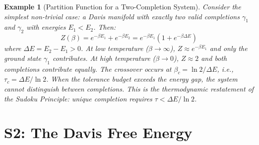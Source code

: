\documentclass[11pt,letterpaper]{article}
\newtheorem{example}[conjecture]{Example}
\begin{document}
\begin{example}[Partition Function for a Two-Completion System]
Consider the simplest non-trivial case: a Davis manifold with exactly two 
valid completions $\gamma_1$ and $\gamma_2$ with energies $E_1 < E_2$. Then:
\begin{equation}
    Z(\beta) = e^{-\beta E_1} + e^{-\beta E_2} 
    = e^{-\beta E_1}\left(1 + e^{-\beta \Delta E}\right)
\end{equation}
where $\Delta E = E_2 - E_1 > 0$. At low temperature ($\beta \to \infty$), 
$Z \approx e^{-\beta E_1}$ and only the ground state $\gamma_1$ contributes. 
At high temperature ($\beta \to 0$), $Z \approx 2$ and both completions 
contribute equally. The crossover occurs at $\beta_c = \ln 2 / \Delta E$, 
i.e., $\tau_c = \Delta E / \ln 2$. When the tolerance budget exceeds the 
energy gap, the system cannot distinguish between completions. This is the 
thermodynamic restatement of the Sudoku Principle: unique completion requires 
$\tau < \Delta E / \ln 2$.
\end{example}

\newpage
\section{S2: The Davis Free Energy}
\end{document}
